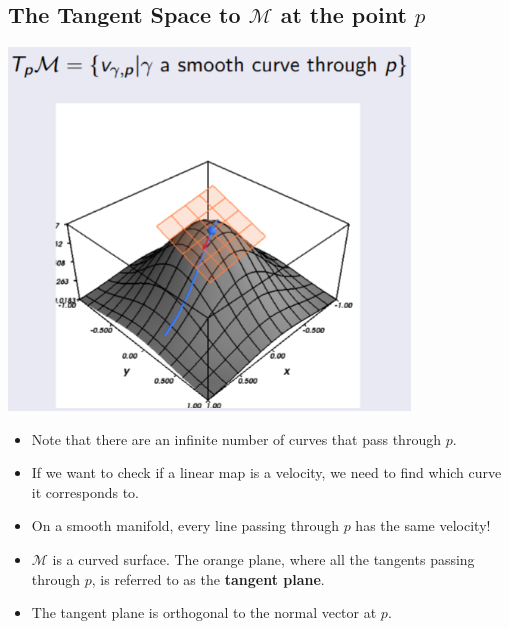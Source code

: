 \documentclass[10pt]{article}
\begin{document}
\subsection*{The Tangent Space to $\mathcal{M}$ at the point $p$}
\begin{center}
    \includegraphics[width=0.8\textwidth]{W6_1.png}
\end{center}
\begin{itemize}
    \item Note that there are an infinite number of curves that pass through $p$.
    \item If we want to check if a linear map is a velocity, we need to find which curve it corresponds to.
    \item On a smooth manifold, every line passing through $p$ has the same velocity!
    \item $\mathcal{M}$ is a curved surface.  The orange plane, where all the tangents passing through $p$, is referred to as the \textbf{tangent plane}.
    \item The tangent plane is orthogonal to the normal vector at $p$.
\end{itemize}
\end{document}

